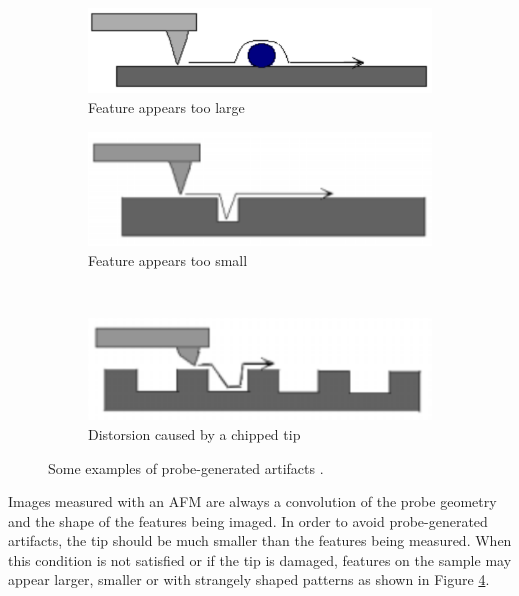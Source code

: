 \documentclass[11pt,a4paper]{article}
\begin{document}
\begin{figure}[ht]
\centering
\begin{subfigure}[b]{0.45\textwidth}
\includegraphics[width=\textwidth]{artifacts_probe_1}
\caption{Feature appears too large}
\label{fig:artifacts_probe_1}
\end{subfigure}
\begin{subfigure}[b]{0.45\textwidth}
\includegraphics[width=\textwidth]{artifacts_probe_2}
\caption{Feature appears too small}
\label{fig:artifacts_probe_2}
\end{subfigure}\\\vspace{.2cm}
\begin{subfigure}[b]{0.45\textwidth}
\includegraphics[width=\textwidth]{artifacts_probe_3}
\caption{Distorsion caused by a chipped tip}
\label{fig:artifacts_probe_3}
\end{subfigure}
\caption{Some examples of probe-generated artifacts \cite{artifacts}.}
\label{fig:artifacts_probe}
\end{figure}

Images measured with an AFM are always a convolution of the probe geometry and the shape of the features being imaged. In order to avoid probe-generated artifacts, the tip should be much smaller than the features being measured. When this condition is not satisfied or if the tip is damaged, features on the sample may appear larger, smaller or with strangely shaped patterns as shown in Figure \ref{fig:artifacts_probe}.
\end{document}
